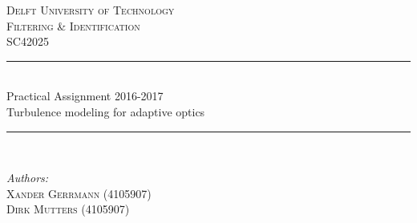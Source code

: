 \documentclass[11pt, oneside,a4paper,fleqn]{report}
\begin{document}
\begin{titlepage}

\newcommand{\HRule}{\rule{\linewidth}{0.5mm}} 

\center 
 

 

\textsc{\LARGE Delft University of Technology}\\[1.5cm] 
\textsc{\Large Filtering \& Identification}\\[0.5cm]
\textsc{\large SC42025}\\[0.5cm]


\HRule \\[0.4cm]
Practical Assignment 2016-2017\\ Turbulence modeling for adaptive optics{ \huge \bfseries }\\[0.4cm] 
\HRule \\[1.5cm]
 

\begin{minipage}{0.4\textwidth}
\begin{flushleft} \large
\emph{Authors:}\\
\textsc{Xander Gerrmann} (4105907)\\
\textsc{Dirk Mutters} (4105907)
\end{flushleft}
\end{minipage}
~
\begin{minipage}{0.4\textwidth}
\begin{flushright} \large
\emph{} \\
 \textsc{} %
\end{flushright}
\end{minipage}\\[1cm]



\end{titlepage}
\end{document}
